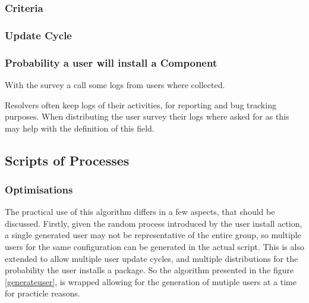 \subsubsection{Criteria}





\subsubsection{Update Cycle}



\subsubsection{Probability a user will install a Component}

With the survey a call some logs from users where collected.


Resolvers often keep logs of their activities, for reporting and bug tracking purposes.
When distributing the user survey their logs where asked for as this may help with the definition of this field.


\subsection{Scripts of Processes}
\subsubsection{Optimisations}

The practical use of this algorithm differs in a few aspects, that should be discussed.
Firstly, given the random process introduced by the user install action,
a single generated user may not be representative of the entire group, so multiple users for the same configuration can be generated in the actual script.
This is also extended to allow multiple user update cycles, and multiple distributions for the probability the user installs a package.
So the algorithm presented in the figure \ref{generateuser}, is wrapped allowing for the generation of mutiple users at a time for practicle reasons.   

